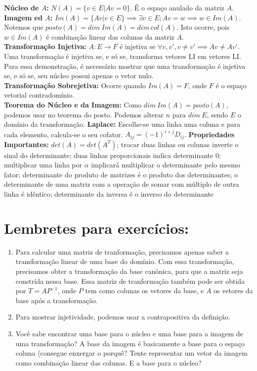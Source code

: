 \documentclass[12pt,letterpaper]{article}
\begin{document}
\textbf{Núcleo de $A$: }$N(A) = \{v \in E | Av = 0\}$. É o espaço anulado da matriz $A$. \\
\textbf{Imagem ed $A$:} $Im(A) = \{Av | v \in E\} \implies \exists v \in E; Av = w \implies w \in Im(A) $.
Notemos que $posto(A) = dim~Im(A) = dim~col(A)$. Isto ocorre, pois $w \in Im(A)$ é combinação linear das colunas da matriz $A$. \\
\textbf{Transformação Injetiva:} $A: E \to F$ é injetiva se $\forall v, v', v \neq v' \implies Av \neq Av'$. Uma transformação é injetiva se, e só se, transforma vetores LI em vetores LI. Para essa demonstração, é necessário mostrar que uma transformação é injetiva se, e só se, seu núcleo possui apenas o vetor nulo. \\
\textbf{Transformação Sobrejetiva: }Ocorre quando $Im(A) = F$, onde $F$ é o espaço vetorial contradomínio. \\
\textbf{Teorema do Núcleo e da Imagem: } Como $dim~Im(A) = posto(A)$, podemos usar no teorema do posto. Podemos alterar $n$ para $dim~E$, sendo $E$ o domínio da transformação.
\textbf{Laplace: }Escolhe-se uma linha uma coluna e para cada elemento, calcula-se o seu cofator. $A_{ij} = (-1)^{i+j}D_{ij}$.
\textbf{Propriedades Importantes: } $det(A) = det(A^{T})$; trocar duas linhas ou colunas inverte o sinal do determinante; duas linhas proporcionais indica determinante 0; multiplicar uma linha por $\alpha$ implicará multiplicar o determinante pelo mesmo fator; determinante do produto de matrizes é o produto dos determinantes;  o determinante de uma matriz com a operação de somar com múltiplo de outra linha é idêntico; determinante da inversa é o inverso do determinante 

\section*{Lembretes para exercícios: }
\begin{enumerate}
    \item Para calcular uma matriz de tranformação, precisamos apenas saber a transformação linear de uma base do domínio. Com essa transformação, precisamos obter a transformação da base canônica, para que a matriz seja constrída nessa base. Essa matriz de tranformação também pode ser obtida por $T = AP^{-1}$, onde $P$ tem como colunas os vetores da base, e $A$ os vetores da base após a transformação.
    \item Para mostrar injetividade, podemos usar a contrapositiva da definição. 
    \item Você sabe encontrar uma base para o núcleo e uma base para a imagem de uma transformação? A base da imagem é basicamente a base para o espaço coluna (consegue enxergar o porquê? Tente representar um vetor da imagem como combinação linear das colunas. E a base para o núcleo?  
\end{enumerate}
\end{document}
